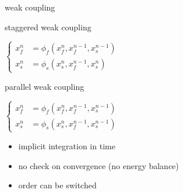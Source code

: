\documentclass[10pt,t]{beamer}
\makeatletter
\def\beamer@writeslidentry@miniframesoff{%
  \expandafter\beamer@ifempty\expandafter{\beamer@framestartpage}{}%
  {%
    \clearpage\beamer@notesactions%
  }
}
\newcommand*{\miniframesoff}{\let\beamer@writeslidentry=\beamer@writeslidentry@miniframesoff}
\makeatother
\begin{document}
\miniframesoff


\begin{frame}{weak coupling}\label{couplingdetails}


  \begin{block}{staggered weak coupling}
  \begin{center}
  $
  \left\{
    \begin{aligned}
        x_f^n&=\phi_f\left(x_f^n,x_f^{n-1},x_s^{n-1} \right) \\
        x_s^n&=\phi_s\left(x_s^n,x_f^{n-1},x_s^{n} \right)
    \end{aligned}
    \right.
  $
      
  \end{center}
  \end{block}  


  \begin{block}{parallel weak coupling}
  \begin{center}
  $
  \left\{
    \begin{aligned}
        x_f^n&=\phi_f\left(x_f^n,x_f^{n-1},x_s^{n-1} \right) \\
        x_s^n&=\phi_s\left(x_s^n,x_f^{n-1},x_s^{n-1} \right)
    \end{aligned}
    \right.
  $
  \end{center}
  \end{block}  



\begin{itemize}
    \item implicit integration in time
    \item no check on convergence (no energy balance)
    \item order can be switched
\end{itemize}

\end{frame}
\end{document}
